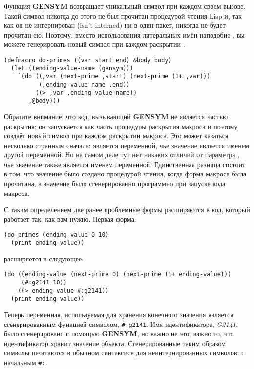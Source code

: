 Функция \textbf{GENSYM} возвращает уникальный символ при каждом своем вызове. Такой символ
никогда до этого не был прочитан процедурой чтения Lisp и, так как он не интернирован
(isn't interned) ни в один пакет, никогда не будет прочитан ею. Поэтому, вместо
использования литеральных имён наподобие , вы можете генерировать новый
символ при каждом раскрытии .

\begin{lstlisting}
(defmacro do-primes ((var start end) &body body)
  (let ((ending-value-name (gensym)))
    `(do ((,var (next-prime ,start) (next-prime (1+ ,var)))
          (,ending-value-name ,end))
         ((> ,var ,ending-value-name))
       ,@body)))
\end{lstlisting}

Обратите внимание, что код, вызывающий \textbf{GENSYM} не является частью раскрытия; он
запускается как часть процедуры раскрытия макроса и поэтому создаёт новый символ при
каждом раскрытии макроса. Это может казаться несколько странным сначала:
 является переменной, чье значение является именем другой
переменной. Но на самом деле тут нет никаких отличий от параметра , чье значение
также является именем переменной. Единственная разница состоит в том, что значение
 было создано процедурой чтения, когда форма макроса была прочитана, а значение
 было сгенерированно программно при запуске кода макроса.

С таким определением две ранее проблемные формы расширяются в код, который работает так,
как вам нужно. Первая форма:

\begin{lstlisting}
(do-primes (ending-value 0 10)
  (print ending-value))
\end{lstlisting}

расширяется в следующее:

\begin{lstlisting}
(do ((ending-value (next-prime 0) (next-prime (1+ ending-value)))
     (#:g2141 10))
    ((> ending-value #:g2141))
  (print ending-value))
\end{lstlisting}

Теперь переменная, используемая для хранения конечного значения является сгенерированным
функцией  символом, \lstinline!#:g2141!. Имя идентификатора, \textit{G2141},
было сгенерировано с помощью \textbf{GENSYM}, но важно не это; важно то, что идентификатор
хранит значение объекта. Сгенерированные таким образом символы печатаются в обычном
синтаксисе для неинтернированных символов: с начальным \lstinline!#:!.

